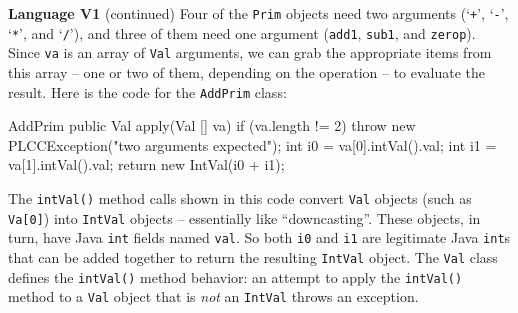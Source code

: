 \begin{minipage}[t]{\sw}
\slidenumber
\LARGE
{\bf Language V1} (continued)\exx
Four of the \verb'Prim' objects need two arguments
(`\verb'+'', `\verb'-'', `\verb'*'', and `\verb'/''),
and three of them need one argument
(\verb'add1', \verb'sub1', and \verb'zerop').
Since \verb'va' is an array of \verb'Val' arguments,
we can grab the appropriate items from this array --
one or two of them, depending on the operation --
to evaluate the result.
Here is the code for the \verb'AddPrim' class:
{\Large
\begin{qv}
AddPrim
    public Val apply(Val [] va) {
        if (va.length != 2)
            throw new PLCCException("two arguments expected");
        int i0 = va[0].intVal().val;
        int i1 = va[1].intVal().val;
        return new IntVal(i0 + i1);
    }
\end{qv}
}
The \verb'intVal()' method calls shown in this
code convert \verb'Val' objects (such as \verb'Va[0]')
into \verb'IntVal' objects -- essentially like ``downcasting''.
These objects, in turn, have Java \verb'int' fields named \verb'val'.
So both \verb'i0' and \verb'i1' are legitimate Java \verb'int's
that can be added together to return the resulting \verb'IntVal' object.
The \verb'Val' class defines the \verb'intVal()' method behavior:
an attempt to apply the \verb'intVal()' method
to a \verb'Val' object that is {\em not} an \verb'IntVal'
throws an exception.
\end{minipage}
\clearpage
